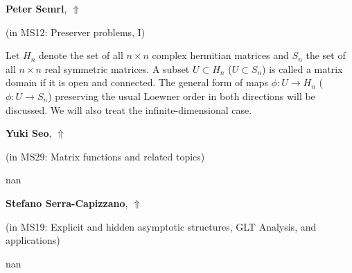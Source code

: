 \documentclass[ILAS2025-program.tex]{subfiles}
\begin{document}
     \hypertarget{down0016}{}\begin{ilasabstract}
    
    \textbf{Peter Semrl},  \hfill \hyperlink{up0016}{$\Uparrow$}
    
    (in {\color{mstitle}MS12: Preserver problems, I})
        
        \mtskip
    Let $H_n$ denote the set of all $n\times n$ complex hermitian matrices and $S_n$ the set of all $n \times n$ real symmetric matrices. A subset $U \subset H_n$ ($U \subset S_n$) is called a matrix domain if it is open and connected. The general form of maps $\phi : U \to H_n$ ($\phi : U \to S_n$) preserving the usual Loewner order in both directions will be discussed. We will also treat the infinite-dimensional case.
\end{ilasabstract}
     \hypertarget{down0157}{}\begin{ilasabstract}
    
    \textbf{Yuki Seo},  \hfill \hyperlink{up0157}{$\Uparrow$}
    
    (in {\color{mstitle}MS29: Matrix functions and related topics})
        
        \mtskip
    nan\end{ilasabstract}
     \hypertarget{down0218}{}\begin{ilasabstract}
    
    \textbf{Stefano Serra-Capizzano},  \hfill \hyperlink{up0218}{$\Uparrow$}
    
    (in {\color{mstitle}MS19: Explicit and hidden asymptotic structures, GLT Analysis, and applications})
        
        \mtskip
    nan\end{ilasabstract}
\end{document}
